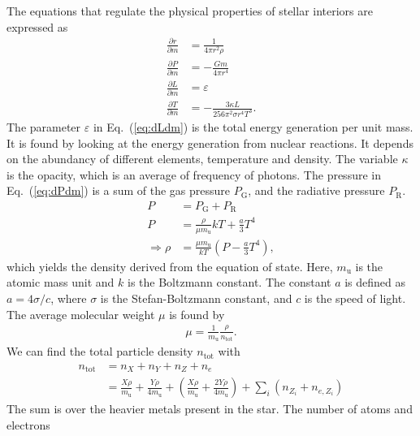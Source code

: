 \documentclass[a4paper, 11pt, english]{article}
\newcommand{\refeq}[1]{(\textcolor{red}{\ref{eq:#1}})} %
\begin{document}
The equations that regulate the physical properties of stellar interiors are
expressed as
\begin{align}
	\frac{\partial r}{\partial m} &= \frac{1}{4\pi r^2 \rho} \label{eq:drdm} \\
	\frac{\partial P}{\partial m} &= -\frac{Gm}{4\pi r^4} \label{eq:dPdm} \\
	\frac{\partial L}{\partial m} &= \varepsilon \label{eq:dLdm} \\
	\frac{\partial T}{\partial m} &= -\frac{3 \kappa L}{256 \pi^2 \sigma r^4 T^3}. 
	\label{eq:dTdm} 
\end{align}
The parameter $\varepsilon$ in Eq.~\refeq{dLdm} is the total energy generation per unit mass.
It is found by looking at the energy generation from nuclear reactions. It depends on the
abundancy of different elements, temperature and density. The variable $\kappa$ is the
opacity, which is an average of frequency of photons.
The pressure in Eq.~\refeq{dPdm} is a sum of the gas pressure $P_{\mathrm{G}}$,
and the radiative pressure $P_{\mathrm{R}}$. 
\begin{align}
	P &= P_{\mathrm{G}} + P_{\mathrm{R}} \nonumber \\
	P &= \frac{\rho}{\mu m_{\mathrm{u}}} kT + \frac{a}{3}T^4 \nonumber \\
	\Rightarrow \rho &= \frac{\mu m_{\mathrm{u}}}{kT} \left( P - \frac{a}{3}T^4 \right),
	\label{eq:density}
\end{align}
which yields the density derived from the equation of state. Here, $m_{\mathrm{u}}$ is the
atomic mass unit and $k$ is the Boltzmann
constant. The constant $a$ is defined as $a = 4\sigma / c$, where $\sigma$ is the
Stefan-Boltzmann constant, and $c$ is the speed of light. The average molecular weight
$\mu$ is found by
\begin{align}
	\mu = \frac{1}{m_{\mathrm{u}}}\frac{\rho}{n_{\mathrm{tot}}}.
	\label{eq:mu}
\end{align}
We can find the total particle density $n_{\mathrm{tot}}$ with
\begin{align*}
	n_{\mathrm{tot}} &= n_X + n_Y + n_Z + n_e \\
	&= \frac{X\rho}{m_{\mathrm{u}}} + \frac{Y\rho}{4m_{\mathrm{u}}} +
	 \left( \frac{X\rho}{m_{\mathrm{u}}} +
	 \frac{2Y\rho}{4m_{\mathrm{u}}}\right) + \sum\limits_i (n_{Z_i} + n_{e,Z_i})
\end{align*}
The sum is over the heavier metals present in the star. The number of atoms and electrons
\end{document}
